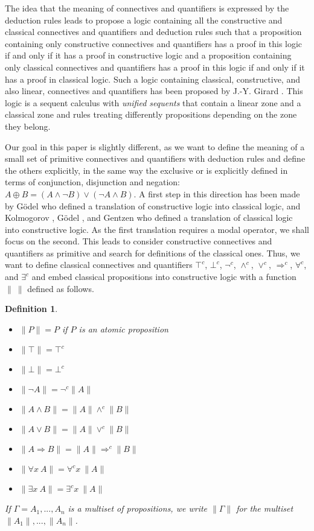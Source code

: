 \documentclass{article}
\newcommand{\fa}{\forall}
\newcommand{\ex}{\exists}
\newcommand{\topc}{\top^c}
\newcommand{\botc}{\bot^c}
\newcommand{\negc}{\neg^c}
\newcommand{\wedgec}{\wedge^c}
\newcommand{\veec}{\vee^c}
\newcommand{\Rightarrowc}{\Rightarrow^c}
\newcommand{\fac}{\fa^c}
\newcommand{\exc}{\ex^c}
\newtheorem{definition}{Definition}
\begin{document}
The idea that the meaning of connectives and quantifiers is expressed
by the deduction rules leads to propose a logic containing all the
constructive and classical connectives and quantifiers and deduction
rules such that a proposition containing only constructive connectives
and quantifiers
has a proof in this logic if and only if it has a proof in
constructive logic and a proposition containing only classical
connectives and quantifiers
has a proof in this logic if and only if it has a proof in
classical logic.  Such a logic containing classical, constructive, and
also linear, connectives and quantifiers has been proposed by J.-Y. Girard
\cite{Girard}. This logic is a sequent calculus with {\em unified
  sequents} that contain a linear zone and a classical zone and rules
treating differently propositions depending on the zone they belong.

Our goal in this paper is slightly different, as we want to define the
meaning of a small set of primitive connectives and quantifiers with
deduction rules and define the others explicitly, in the same way the
exclusive or is explicitly defined in terms of conjunction,
disjunction and negation: $A \oplus B = (A \wedge \neg B) \vee (\neg A
\wedge B)$.  A first step in this direction has been made by G\"odel
\cite{GodelS4} who defined a translation of constructive logic into
classical logic, and Kolmogorov \cite{Kolmogorov}, G\"odel
\cite{Godel}, and Gentzen \cite{Gentzen} who defined a
translation of classical logic into constructive logic.
As the first translation requires a modal
operator, we shall focus on the second. This leads to consider
constructive connectives and quantifiers as primitive and search for
definitions of the classical ones.  Thus, we want to define classical
connectives and quantifiers $\topc$, $\botc$, $\negc$, $\wedgec$,
$\veec$, $\Rightarrowc$, $\fac$, and $\exc$ and embed classical
propositions into constructive logic with a function $\|~\|$ defined
as follows.
\begin{definition}~
\begin{itemize}
\item $\|P\| = P$ if $P$ is an atomic proposition
\item $\|\top\| = \topc$
\item $\|\bot\| = \botc$
\item $\|\neg A\| = \negc \|A\|$
\item $\|A \wedge B\| = \|A\| \wedgec \|B\|$
\item $\|A \vee B\| = \|A\| \veec \|B\|$
\item $\|A \Rightarrow B\| = \|A\| \Rightarrowc \|B\|$
\item $\|\fa x~A\| = \fac x~\|A\|$
\item $\|\ex x~A\| = \exc x~\|A\|$
\end{itemize}
If $\Gamma = A_1, ..., A_n$ is a multiset of propositions, we write 
$\|\Gamma\|$ for the multiset $\|A_1\|, ..., \|A_n\|$.
\end{definition}
\end{document}
